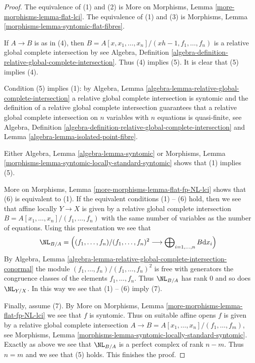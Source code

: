 \begin{proof}
The equivalence of (1) and (2) is
More on Morphisms, Lemma \ref{more-morphisms-lemma-flat-lci}.
The equivalence of (1) and (3) is
Morphisms, Lemma \ref{morphisms-lemma-syntomic-flat-fibres}.

\medskip\noindent
If $A \to B$ is as in (4), then
$B = A[x, x_1, \ldots, x_n]/(xh - 1, f_1, \ldots, f_n)$
is a relative global complete intersection by see Algebra, Definition
\ref{algebra-definition-relative-global-complete-intersection}.
Thus (4) implies (5).
It is clear that (5) implies (4).

\medskip\noindent
Condition (5) implies (1): by
Algebra, Lemma \ref{algebra-lemma-relative-global-complete-intersection}
a relative global complete intersection is syntomic and
the definition of a relative global complete intersection
guarantees that a relative global complete intersection on
$n$ variables with $n$ equations is quasi-finite, see
Algebra, Definition
\ref{algebra-definition-relative-global-complete-intersection} and
Lemma \ref{algebra-lemma-isolated-point-fibre}.

\medskip\noindent
Either Algebra, Lemma \ref{algebra-lemma-syntomic} or
Morphisms, Lemma \ref{morphisms-lemma-syntomic-locally-standard-syntomic}
shows that (1) implies (5).

\medskip\noindent
More on Morphisms, Lemma \ref{more-morphisms-lemma-flat-fp-NL-lci} shows that
(6) is equivalent to (1). If the equivalent conditions (1) -- (6) hold,
then we see that affine locally $Y \to X$ is given by a relative global
complete intersection $B = A[x_1, \ldots, x_n]/(f_1, \ldots, f_n)$
with the same number of variables as the number of
equations. Using this presentation we see that
$$
\NL_{B/A} =\left(
(f_1, \ldots, f_n)/(f_1, \ldots, f_n)^2
\longrightarrow
\bigoplus\nolimits_{i = 1, \ldots, n} B \text{d} x_i\right)
$$
By Algebra, Lemma
\ref{algebra-lemma-relative-global-complete-intersection-conormal}
the module $(f_1, \ldots, f_n)/(f_1, \ldots, f_n)^2$
is free with generators the congruence classes of the elements
$f_1, \ldots, f_n$. Thus $\NL_{B/A}$ has rank $0$ and so does $\NL_{Y/X}$.
In this way we see that (1) -- (6) imply (7).

\medskip\noindent
Finally, assume (7). By
More on Morphisms, Lemma \ref{more-morphisms-lemma-flat-fp-NL-lci}
we see that $f$ is syntomic. Thus on suitable affine opens
$f$ is given by a relative global complete intersection
$A \to B = A[x_1, \ldots, x_n]/(f_1, \ldots, f_m)$, see
Morphisms, Lemma \ref{morphisms-lemma-syntomic-locally-standard-syntomic}.
Exactly as above we see that $\NL_{B/A}$ is a perfect complex
of rank $n - m$. Thus $n = m$ and we see that (5) holds.
This finishes the proof.
\end{proof}

